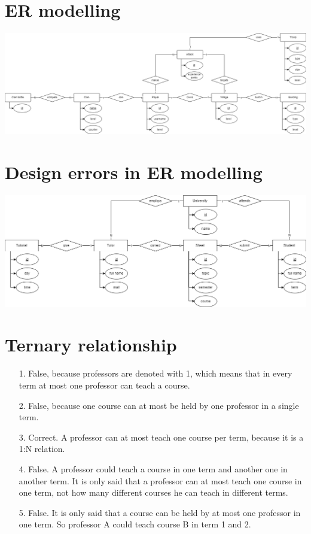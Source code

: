 



\section{ER modelling}

\includegraphics[width=\textwidth]{1.drawio.png}

\section{Design errors in ER modelling}

\includegraphics[width=\textwidth]{2.drawio.png}

\section{Ternary relationship}

\begin{itemize}
	\item[1.] False, because professors are denoted with 1, which means that in every term at most one professor can teach a course.
	\item[2.] False, because one course can at most be held by one professor in a single term.
	\item[3.] Correct. A professor can at most teach one course per term, because it is a 1:N relation.
	\item[4.] False. A professor could teach a course in one term and another one in another term. It is only said that a professor can at most teach one course in one term, not how many different courses he can teach in different terms.
	\item[5.] False. It is only said that a course can be held by at most one professor in one term. So professor A could teach course B in term 1 and 2. 
\end{itemize}

